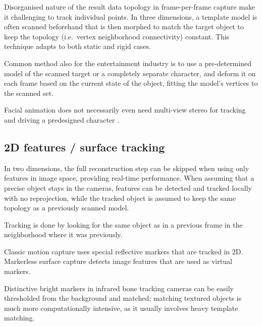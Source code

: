 Disorganised nature of the result data topology in frame-per-frame capture make it challenging to track individual points.
In three dimensions, a template model is often scanned beforehand that is then morphed to match the target object to keep the topology (i.e.~vertex neighborhood connectivity) constant.
This technique adapts to both static and rigid cases.
\cite{bojsen2012tracking,li2009robust}

Common method also for the entertainment industry is to use a pre-determined model of the scanned target or a completely separate character, and deform it on each frame based on the current state of the object, fitting the model's vertices to the scanned set.

Facial animation does not necessarily even need multi-view stereo for tracking and driving a predesigned character \cite{chuang2002performance,deng2007computer}.


\subsection{2D features / surface tracking} %



In two dimensions, the full reconstruction step can be skipped when using only features in image space, providing real-time performance. \cite{pilet2005real}
When assuming that a precise object stays in the cameras, features can be detected and tracked locally with no reprojection, while the tracked object is assumed to keep the same topology as a previously scanned model.

Tracking is done by looking for the same object as in a previous frame in the neighborhood where it was previously.



Classic motion capture uses special reflective markers that are tracked in 2D.
Markerless surface capture detects image features that are used as virtual markers.

Distinctive bright markers in infrared bone tracking cameras can be easily thresholded from the background and matched; matching textured objects is much more computationally intensive, as it usually involves heavy template matching.

